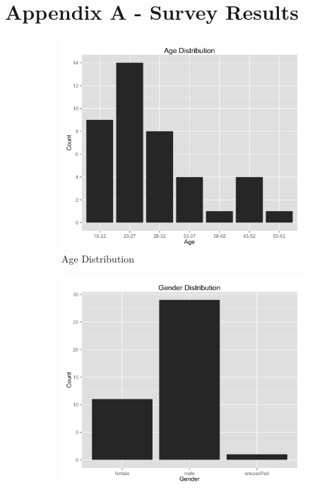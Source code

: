\documentclass[12pt]{article}
\begin{document}


\newpage
\section*{Appendix A - Survey Results}

\begin{figure}[H]
\centering
\begin{subfigure}{.5\textwidth}
    \centering
    \includegraphics[width=1.0\linewidth]{graphs/age.png}
    \caption{Age Distribution}
    \label{agedistribution}
\end{subfigure}%
\begin{subfigure}{.5\textwidth}
    \centering
    \includegraphics[width=1.0\linewidth]{graphs/gender.png}

\end{subfigure}
\end{figure}
\end{document}
